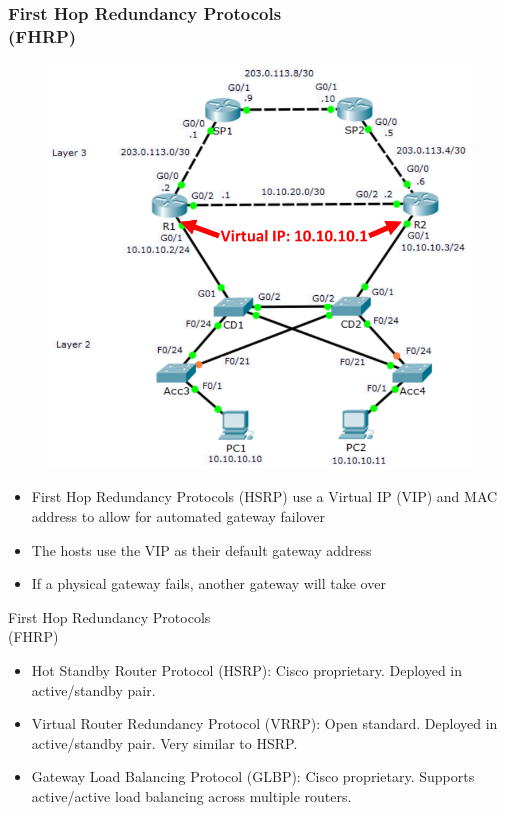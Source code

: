 \documentclass[pdflatex,compress,mathserif]{beamer}
\begin{document}
\begin{frame}
	\frametitle{First Hop Redundancy Protocols\\ (FHRP)}
	\begin{multicols}{2}
		\begin{figure}
			\centering
			\includegraphics[width=\linewidth]{img/img10}
		\end{figure}
		\columnbreak
		\begin{itemize}
			\item First Hop Redundancy Protocols
(HSRP) use a Virtual IP (VIP) and
MAC address to allow for
automated gateway failover
			\item The hosts use the VIP as their
default gateway address
			\item If a physical gateway fails, another
gateway will take over
		\end{itemize}
	\end{multicols}
\end{frame}

\begin{frame}{First Hop Redundancy Protocols\\ (FHRP)}
	\begin{itemize}
		\item Hot Standby Router Protocol (HSRP): Cisco proprietary. Deployed in
active/standby pair.
		\item Virtual Router Redundancy Protocol (VRRP): Open standard. Deployed
in active/standby pair. Very similar to HSRP.
		\item Gateway Load Balancing Protocol (GLBP): Cisco proprietary. Supports
active/active load balancing across multiple routers.
	\end{itemize}
\end{frame}
\end{document}
